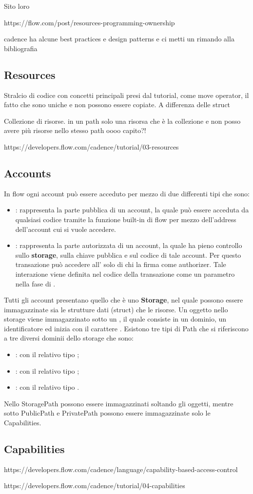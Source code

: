 Sito loro

https://flow.com/post/resources-programming-ownership

cadence ha alcune best practices e design patterns e ci metti un rimando alla bibliografia
\subsection{Resources}
Stralcio di codice con concetti principali presi dal tutorial, come move operator, il fatto che sono uniche e non possono essere copiate. A differenza delle struct 

Collezione di risorse. in un path solo una risorsa che è la collezione e non posso avere più risorse nello stesso path oooo capito?!

https://developers.flow.com/cadence/tutorial/03-resources

\subsection{Accounts}
In flow ogni account può essere acceduto per mezzo di due differenti tipi che sono:
\begin{itemize}
	\item {}: rappresenta la parte pubblica di un account, la quale può essere acceduta da qualsiasi codice tramite la funzione built-in di flow  per mezzo dell'address dell'account cui si vuole accedere.
	\item {}: rappresenta la parte autorizzata di un account, la quale ha pieno controllo sullo \textbf{storage}, sulla chiave pubblica e sul codice di tale account. Per questo transazione può accedere all' solo di chi la firma come authorizer. Tale interazione viene definita nel codice della transazione come un parametro nella fase di .
\end{itemize}
Tutti gli account presentano quello che è uno \textbf{Storage}, nel quale possono essere immagazzinate sia le strutture dati (struct) che le risorse. Un oggetto nello storage viene immagazzinato sotto un , il quale consiste in un dominio, un identificatore ed inizia con il carattere \codeinline{/}. Esistono tre tipi di Path che si riferiscono a tre diversi dominii dello storage che sono:
\begin{itemize}
	\item {}: con il relativo tipo ;
	\item {}: con il relativo tipo ;
	\item {}: con il relativo tipo .
\end{itemize}
Nello StoragePath possono essere immagazzinati soltando gli oggetti, mentre sotto PublicPath e PrivatePath possono essere immagazzinate solo le Capabilities.

\subsection{Capabilities}
https://developers.flow.com/cadence/language/capability-based-access-control

https://developers.flow.com/cadence/tutorial/04-capabilities